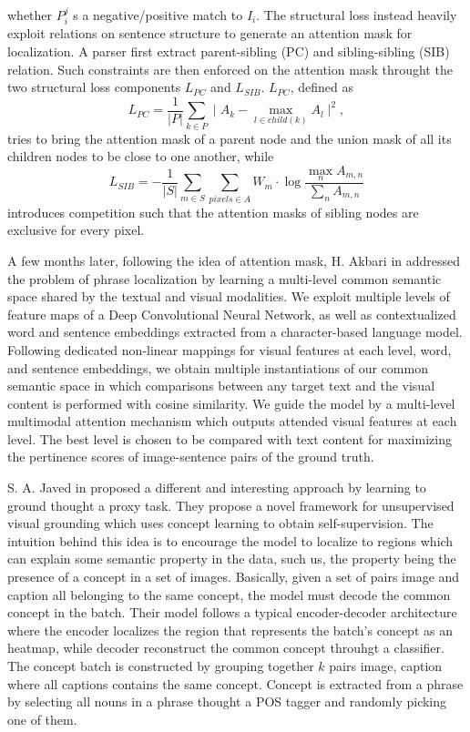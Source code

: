 whether $P^j_i$ s a negative/positive match to $I_i$. The structural
loss instead heavily exploit relations on sentence structure to
generate an attention mask for localization. A parser first extract
parent-sibling (PC) and sibling-sibling (SIB) relation. Such
constraints are then enforced on the attention mask throught the two
structural loss components $L_{PC}$ and $L_{SIB}$. $L_{PC}$, defined
as 
\begin{equation}
  L_{PC} = \frac{1}{|P|} \sum_{k \in P} \mid A_k - \max_{l \in child(k)} A_l \mid ^ 2,
\end{equation}
tries to bring the attention mask of a parent node and the union mask
of all its children nodes to be close to one another, while
\begin{equation}
  L_{SIB} = - \frac{1}{|S|} \sum_{m \in S} \sum_{pixels \in A} W_m \cdot \log \frac{\max_n A_{m,n}}{\sum_n A_{m,n}}
\end{equation}
introduces competition such that the attention masks of sibling nodes
are exclusive for every pixel.

A few months later, following the idea of attention mask, H. Akbari
\etal{} in \cite{akbari2019multi} addressed the problem of phrase
localization  by learning a multi-level common semantic space shared
by the textual and visual modalities. We exploit multiple levels of
feature maps of a Deep Convolutional Neural Network, as well as
contextualized word and sentence embeddings extracted from a
character-based language model. Following dedicated non-linear
mappings for visual features at each level, word, and sentence
embeddings, we obtain multiple instantiations of our common semantic
space in which comparisons between any target text and the visual
content is performed with cosine similarity. We guide the model by a
multi-level multimodal attention mechanism which outputs attended
visual features at each level. The best level is chosen to be compared
with text content for maximizing the pertinence scores of
image-sentence pairs of the ground truth.

S. A. Javed \etal{} in \cite{javed2018learning} proposed a different
and interesting approach by learning to ground thought a proxy task.
They propose a novel framework for unsupervised visual grounding which
uses concept learning to obtain self-supervision. The intuition behind
this idea is to encourage the model to localize to regions which can
explain some semantic property in the data, such us, the property
being the presence of a concept in a set of images. Basically, given a
set of pairs image and caption all belonging to the same concept, the
model must decode the common concept in the batch. Their model follows
a typical encoder-decoder architecture where the encoder localizes the
region that represents the batch's concept as an heatmap, while
decoder reconstruct the common concept throuhgt a classifier. The
concept batch is constructed by grouping together $k$ pairs image,
caption where all captions contains the same concept. Concept is
extracted from a phrase by selecting all nouns in a phrase thought a
POS tagger and randomly picking one of them.

